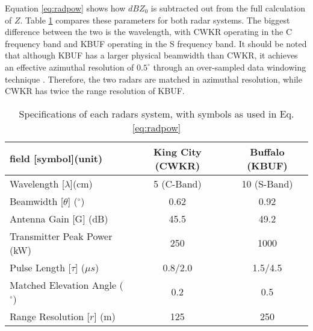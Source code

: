Equation \ref{eq:radpow} shows how $dBZ_0$ is subtracted out from the full calculation of $Z$. Table \ref{radarspecs} compares these parameters for both radar systems. The biggest difference between the two is the wavelength, with CWKR operating in the C frequency band and KBUF operating in the S frequency band. It should be noted that although KBUF has a larger physical beamwidth than CWKR, it achieves an effective azimuthal resolution of $0.5^{\circ}$ through an over-sampled data windowing technique \citep{Torres2007}. Therefore, the two radars are matched in azimuthal resolution, while CWKR has twice the range resolution of KBUF.

\begin{table}[h]
    \caption{Specifications of each radars system, with symbols as used in Eq. \ref{eq:radpow}}\label{radarspecs}
    \begin{center}
    \begin{tabular}{|l|c|c|}
    \hline
     field [symbol](unit) & King City (CWKR) & Buffalo (KBUF) \\
    \hline\hline
    Wavelength [$\lambda$](cm) & 5 (C-Band) & 10 (S-Band) \\
    \hline
    Beamwidth [$\theta$] ($^\circ$)  & 0.62  & 0.92 \\
    \hline
     Antenna Gain [G] (dB) & 45.5 & 49.2 \\
    \hline
     Transmitter Peak Power (kW) & 250 & 1000 \\
    \hline
     Pulse Length [$\tau$] ($\mu s$) &  0.8/2.0 & 1.5/4.5 \\
    \hline
     Matched Elevation Angle ($^\circ$) & 0.2 & 0.5 \\
    \hline
     Range Resolution [$r$] (m)& 125 & 250 \\
    \hline
    \end{tabular}
    \end{center}
\end{table}


